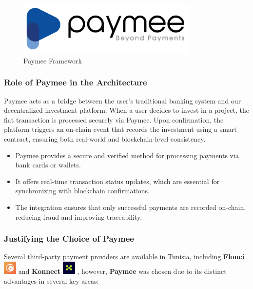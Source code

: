 \begin{figure}[htbp]
\centering
\includegraphics[width=0.8\textwidth]{images/paymee_framework.png}
\caption{Paymee Framework}
\label{fig:paymee-framework}
\end{figure}

\subsubsection{Role of Paymee in the Architecture}

Paymee acts as a bridge between the user's traditional banking system and our decentralized investment platform. When a user decides to invest in a project, the fiat transaction is processed securely via Paymee. Upon confirmation, the platform triggers an on-chain event that records the investment using a smart contract, ensuring both real-world and blockchain-level consistency.

\begin{itemize}
    \item Paymee provides a secure and verified method for processing payments via bank cards or wallets.
    \item It offers real-time transaction status updates, which are essential for synchronizing with blockchain confirmations.
    \item The integration ensures that only successful payments are recorded on-chain, reducing fraud and improving traceability.
\end{itemize}

\subsubsection{Justifying the Choice of Paymee}

Several third-party payment providers are available in Tunisia, including  \textbf{Flouci} \includegraphics[width=0.05\textwidth]{images/icons/flouci_icon.png} and  \textbf{Konnect} \includegraphics[width=0.05\textwidth]{images/icons/konnect_icon.png} , however, \textbf{Paymee} was chosen due to its distinct advantages in several key areas:

